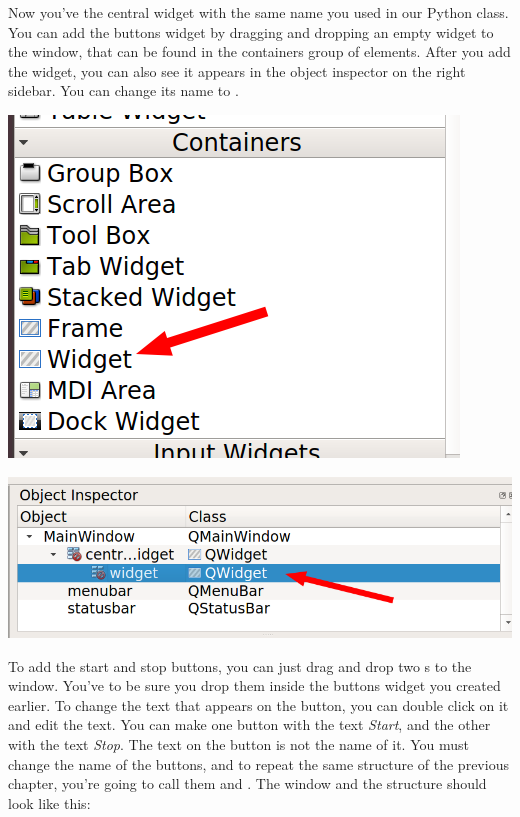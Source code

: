 Now you've the central widget with the same name you used in our Python class. You can add the buttons widget by dragging and dropping an empty widget to the window, that can be found in the containers group of elements. After you add the widget, you can also see it appears in the object inspector on the right sidebar. You can change its name to .

\begin{minipage}{0.45\linewidth}
    \centering
    \includegraphics[width=\textwidth]{images/Chapter_09/04_empty_widget.png}
\end{minipage}
\hspace{0.5cm}
\begin{minipage}{0.45\linewidth}
    \centering
    \includegraphics[width=\textwidth]{images/Chapter_09/04_empty_widget_structure.png}
\end{minipage}

To add the start and stop buttons, you can just drag and drop two s to the window. You've to be sure you drop them inside the buttons widget you created earlier. To change the text that appears on the button, you can double click on it and edit the text. You can make one button with the text \emph{Start}, and the other with the text \emph{Stop}. The text on the button is not the name of it. You must change the name of the buttons, and to repeat the same structure of the previous chapter, you're going to call them  and . The window and the structure should look like this:

